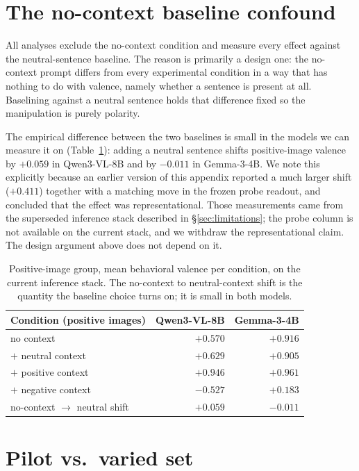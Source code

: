 \documentclass{article}
\newcommand{\gemma}{Gemma-3-4B}
\newcommand{\qwen}{Qwen3-VL-8B}
\begin{document}
\section{The no-context baseline confound}
\label{app:nocontext}

All analyses exclude the no-context condition and measure every effect against the neutral-sentence baseline. The reason is primarily a design one: the no-context prompt differs from every experimental condition in a way that has nothing to do with valence, namely whether a sentence is present at all. Baselining against a neutral sentence holds that difference fixed so the manipulation is purely polarity.

The empirical difference between the two baselines is small in the models we can measure it on (Table~\ref{tab:nocontext}): adding a neutral sentence shifts positive-image valence by $+0.059$ in \qwen{} and by $-0.011$ in \gemma{}. We note this explicitly because an earlier version of this appendix reported a much larger shift ($+0.411$) together with a matching move in the frozen probe readout, and concluded that the effect was representational. Those measurements came from the superseded inference stack described in \S\ref{sec:limitations}; the probe column is not available on the current stack, and we withdraw the representational claim. The design argument above does not depend on it.

\begin{table}[h]
  \caption{Positive-image group, mean behavioral valence per condition, on the current inference stack. The no-context to neutral-context shift is the quantity the baseline choice turns on; it is small in both models.}
  \label{tab:nocontext}
  \centering
  \begin{tabular}{lrr}
    \toprule
    Condition (positive images) & \qwen{} & \gemma{} \\
    \midrule
    no context           & $+0.570$ & $+0.916$ \\
    $+$ neutral context  & $+0.629$ & $+0.905$ \\
    $+$ positive context & $+0.946$ & $+0.961$ \\
    $+$ negative context & $-0.527$ & $+0.183$ \\
    \midrule
    no-context $\to$ neutral shift & $+0.059$ & $-0.011$ \\
    \bottomrule
  \end{tabular}
\end{table}

\section{Pilot vs.\ varied set}
\label{app:pilot}
\end{document}
